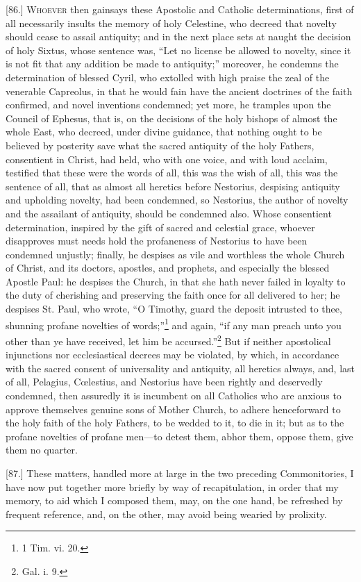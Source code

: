 [86.] \textsc{Whoever} then gainsays these Apostolic and Catholic determinations, first of all necessarily insults the memory of holy Celestine, who decreed that novelty should cease to assail antiquity; and in the next place sets at naught the decision of holy Sixtus, whose sentence was, “Let no license be allowed to novelty, since it is not fit that any addition be made to antiquity;” moreover, he condemns the determination of blessed Cyril, who extolled with high praise the zeal of the venerable Capreolus, in that he would fain have the ancient doctrines of the faith confirmed, and novel inventions condemned; yet more, he tramples upon the Council of Ephesus, that is, on the decisions of the holy bishops of almost the whole East, who decreed, under divine guidance, that nothing ought to be believed by posterity save what the sacred antiquity of the holy Fathers, consentient in Christ, had held, who with one voice, and with loud acclaim, testified that these were the words of all, this was the wish of all, this was the sentence of all, that as almost all heretics before Nestorius, despising antiquity and upholding novelty, had been condemned, so Nestorius, the author of novelty and the assailant of antiquity, should be condemned also. Whose consentient determination, inspired by the gift of sacred and celestial grace, whoever disapproves must needs hold the profaneness of Nestorius to have been condemned unjustly; finally, he despises as vile and worthless the whole Church of Christ, and its doctors, apostles, and prophets, and especially the blessed Apostle Paul: he despises the Church, in that she hath never failed in loyalty to the duty of cherishing and preserving the faith once for all delivered to her; he despises St. Paul, who wrote, “O Timothy, guard the deposit intrusted to thee, shunning profane novelties of words;”\footnote{1 Tim. vi. 20.} and again, “if any man preach unto you other than ye have received, let him be accursed.”\footnote{Gal. i. 9.} But if neither apostolical injunctions nor ecclesiastical decrees may be violated, by which, in accordance with the sacred consent of universality and antiquity, all heretics always, and, last of all, Pelagius, Cœlestius, and Nestorius have been rightly and deservedly condemned, then assuredly it is incumbent on all Catholics who are anxious to approve themselves genuine sons of Mother Church, to adhere henceforward to the holy faith of the holy Fathers, to be wedded to it, to die in it; but as to the profane novelties of profane men—to detest them, abhor them, oppose them, give them no quarter.

[87.] These matters, handled more at large in the two preceding Commonitories, I have now put together more briefly by way of recapitulation, in order that my memory, to aid which I composed them, may, on the one hand, be refreshed by frequent reference, and, on the other, may avoid being wearied by prolixity.
